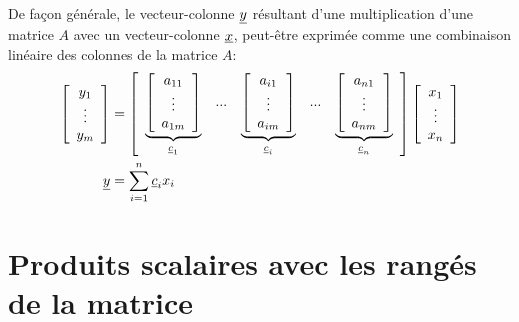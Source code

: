 De façon générale, le vecteur-colonne $\underline{y}$ résultant d'une multiplication d'une matrice $A$ avec un vecteur-colonne $\underline{x}$, peut-être exprimée comme une combinaison linéaire des colonnes de la matrice $A$:
%
\begin{align}
%
\left[ \begin{array}{c} 
	y_1 \\ \vdots \\ y_m
\end{array} \right] 
%
&= 
%
\left[ \begin{array}{c c c c c} 
\underbrace{\left[ \begin{array}{c} 
	a_{11} \\ \vdots \\ a_{1m}
\end{array} \right]}_{\col{c}_1}
& ... &
\underbrace{\left[ \begin{array}{c} 
	a_{i1} \\ \vdots \\ a_{im}
\end{array} \right]}_{\col{c}_i}
& ... &
\underbrace{\left[ \begin{array}{c} 
	a_{n1} \\ \vdots \\ a_{nm}
\end{array} \right]}_{\col{c}_n}
\end{array} \right] 
%
\left[ \begin{array}{c} 
	x_1 \\ \vdots \\ x_n
\end{array} \right]  \\
%
%
\col{y}
&= \sum_{i=1}^{n}{ \col{c}_i x_i}
\end{align}
%

\section{Produits scalaires avec les rangés de la matrice} 
\label{sec:combveccol}

